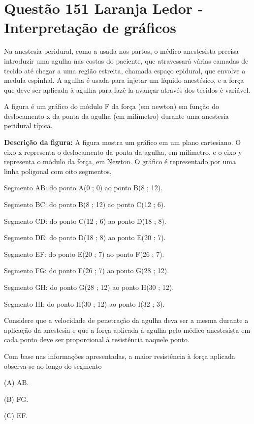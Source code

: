 \section{Questão 151 Laranja Ledor - Interpretação de gráficos}

Na anestesia peridural, como a usada nos partos, o médico anestesista precisa introduzir uma agulha nas costas do paciente, que atravessará várias camadas de tecido até chegar a uma região estreita, chamada espaço epidural, que envolve a medula espinhal. A agulha é usada para injetar um líquido anestésico, e a força que deve ser aplicada à agulha para fazê-la  avançar através dos tecidos é variável.

A figura é um gráfico do módulo F da força (em newton) em função do deslocamento x da ponta da agulha (em milímetro) durante uma anestesia peridural típica. 

\noindent \textbf{Descrição da figura:} A figura mostra um gráfico em um plano cartesiano. O eixo x representa o deslocamento da ponta da agulha, em milímetro, e o eixo y representa o módulo da força, em Newton. O gráfico é representado por uma linha poligonal com oito segmentos, 

\noindent Segmento AB: do ponto A(0 ; 0) ao ponto B(8 ; 12).

\noindent Segmento BC: do ponto B(8 ; 12) ao ponto C(12 ; 6).

\noindent Segmento CD: do ponto C(12 ; 6) ao ponto D(18 ; 8).

\noindent Segmento DE: do ponto D(18 ; 8) ao ponto E(20 ; 7).

\noindent Segmento EF: do ponto E(20 ; 7) ao ponto F(26 ; 7).

\noindent Segmento FG: do ponto F(26 ; 7) ao ponto G(28 ; 12).

\noindent Segmento GH: do ponto G(28 ; 12) ao ponto H(30 ; 12).

\noindent Segmento HI: do ponto H(30 ; 12) ao ponto I(32 ; 3).


Considere que a velocidade de penetração da agulha deva ser a mesma durante a aplicação da anestesia e que a força aplicada à agulha pelo médico anestesista em cada ponto deve ser proporcional à resistência naquele ponto.

Com base nas informações apresentadas, a maior resistência à força aplicada observa-se ao longo do segmento

(A) AB.

(B) FG.

(C) EF.

